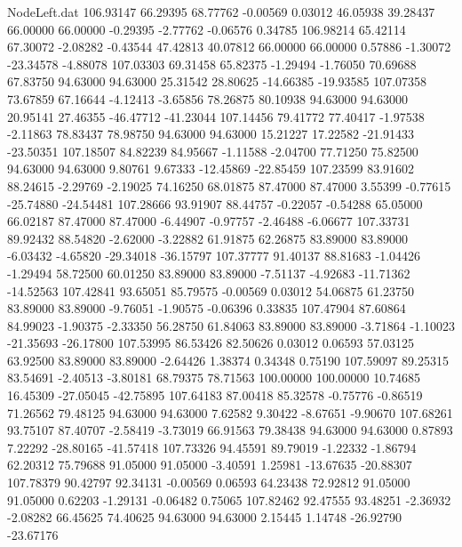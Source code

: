 \begin{filecontents}{NodeLeft.dat}
 106.93147   66.29395   68.77762    -0.00569    0.03012   46.05938   39.28437   66.00000   66.00000   -0.29395   -2.77762   -0.06576    0.34785
 106.98214   65.42114   67.30072    -2.08282   -0.43544   47.42813   40.07812   66.00000   66.00000    0.57886   -1.30072  -23.34578   -4.88078
 107.03303   69.31458   65.82375    -1.29494   -1.76050   70.69688   67.83750   94.63000   94.63000   25.31542   28.80625  -14.66385  -19.93585
 107.07358   73.67859   67.16644    -4.12413   -3.65856   78.26875   80.10938   94.63000   94.63000   20.95141   27.46355  -46.47712  -41.23044
 107.14456   79.41772   77.40417    -1.97538   -2.11863   78.83437   78.98750   94.63000   94.63000   15.21227   17.22582  -21.91433  -23.50351
 107.18507   84.82239   84.95667    -1.11588   -2.04700   77.71250   75.82500   94.63000   94.63000    9.80761    9.67333  -12.45869  -22.85459
 107.23599   83.91602   88.24615    -2.29769   -2.19025   74.16250   68.01875   87.47000   87.47000    3.55399   -0.77615  -25.74880  -24.54481
 107.28666   93.91907   88.44757    -0.22057   -0.54288   65.05000   66.02187   87.47000   87.47000   -6.44907   -0.97757   -2.46488   -6.06677
 107.33731   89.92432   88.54820    -2.62000   -3.22882   61.91875   62.26875   83.89000   83.89000   -6.03432   -4.65820  -29.34018  -36.15797
 107.37777   91.40137   88.81683    -1.04426   -1.29494   58.72500   60.01250   83.89000   83.89000   -7.51137   -4.92683  -11.71362  -14.52563
 107.42841   93.65051   85.79575    -0.00569    0.03012   54.06875   61.23750   83.89000   83.89000   -9.76051   -1.90575   -0.06396    0.33835
 107.47904   87.60864   84.99023    -1.90375   -2.33350   56.28750   61.84063   83.89000   83.89000   -3.71864   -1.10023  -21.35693  -26.17800
 107.53995   86.53426   82.50626     0.03012    0.06593   57.03125   63.92500   83.89000   83.89000   -2.64426    1.38374    0.34348    0.75190
 107.59097   89.25315   83.54691    -2.40513   -3.80181   68.79375   78.71563  100.00000  100.00000   10.74685   16.45309  -27.05045  -42.75895
 107.64183   87.00418   85.32578    -0.75776   -0.86519   71.26562   79.48125   94.63000   94.63000    7.62582    9.30422   -8.67651   -9.90670
 107.68261   93.75107   87.40707    -2.58419   -3.73019   66.91563   79.38438   94.63000   94.63000    0.87893    7.22292  -28.80165  -41.57418
 107.73326   94.45591   89.79019    -1.22332   -1.86794   62.20312   75.79688   91.05000   91.05000   -3.40591    1.25981  -13.67635  -20.88307
 107.78379   90.42797   92.34131    -0.00569    0.06593   64.23438   72.92812   91.05000   91.05000    0.62203   -1.29131   -0.06482    0.75065
 107.82462   92.47555   93.48251    -2.36932   -2.08282   66.45625   74.40625   94.63000   94.63000    2.15445    1.14748  -26.92790  -23.67176

\end{filecontents}
